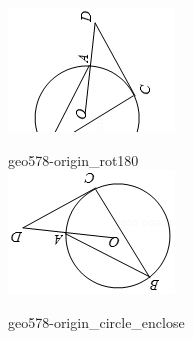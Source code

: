 \documentclass[12pt]{article}
\begin{document}
\begin{center}
\begin{minipage}{0.32\textwidth}
\includegraphics[width=0.95\linewidth]{out_rommath_origin/items/geo578-origin/assets/figure_rot90.png}
\end{minipage}
\par\medskip
\begin{minipage}{0.32\textwidth}\centering
geo578-origin\_rot180\\
\includegraphics[width=0.95\linewidth]{out_rommath_origin/items/geo578-origin/assets/figure_rot180.png}
\end{minipage}
\hfill\begin{minipage}{0.32\textwidth}\centering
geo578-origin\_circle\_enclose\\

\end{minipage}
\end{center}
\end{document}
